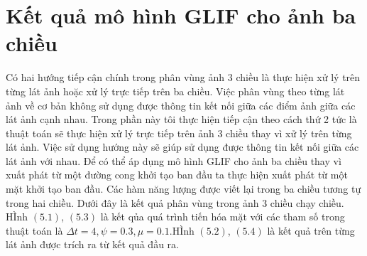 \documentclass[12pt, oneside, a4]{book}
\begin{document}
\section{Kết quả mô hình GLIF cho ảnh ba chiều}
Có hai hướng tiếp cận chính trong phân vùng ảnh 3 chiều là thực hiện xử lý trên từng lát ảnh hoặc xử lý trực tiếp trên ba chiều. Việc phân vùng theo từng lát ảnh về cơ bản không sử dụng được thông tin kết nối giữa các điểm ảnh giữa các lát ảnh cạnh nhau. Trong phần này tôi thực hiện tiếp cận theo cách thứ 2 tức là thuật toán sẽ thực hiện xử lý trực tiếp trên ảnh 3 chiều thay vì xử lý trên từng lát ảnh. Việc sử dụng hướng này sẽ giúp sử dụng được thông tin kết nối giữa các lát ảnh với nhau.
Để có thể áp dụng mô hình GLIF cho ảnh ba chiều thay vì xuất phát từ một đường cong khởi tạo ban đầu ta thực hiện xuất phát từ một mặt khởi tạo ban đầu. Các hàm năng lượng được viết lại trong ba chiều tương tự trong hai chiều. Dưới đây là kết quả phân vùng trong ảnh 3 chiều chạy chiều. HÌnh $(5.1)$, $(5.3)$ là kết qủa quá trình tiến hóa mặt  với các tham số trong thuật toán là $\Delta t=4,\psi=0.3,\mu=0.1 $.HÌnh $(5.2)$,  $(5.4)$ là kết quả trên từng lát ảnh được trích ra từ kết quả đầu ra.
\end{document}
